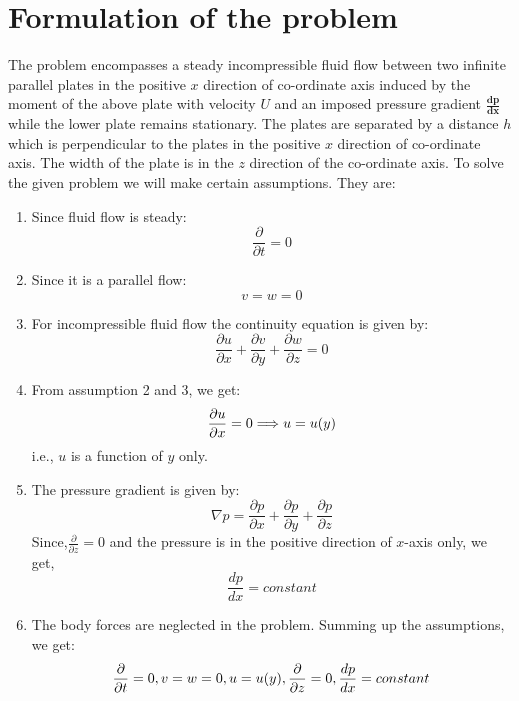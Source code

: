 \documentclass[14pt,one side, a4paper]{extbook}
\begin{document}
	 	\section{Formulation of the problem} The problem encompasses a steady incompressible fluid flow between two infinite parallel plates in the positive $x$ direction of co-ordinate axis induced by the moment of the above plate with velocity $U$ and an imposed pressure gradient $\mathbf{\frac{dp}{dx}}$ while the lower plate remains stationary. The plates are separated by a distance $h$ which is perpendicular to the plates in the positive $x$ direction of co-ordinate axis. The width of the plate is in the $z$ direction of the co-ordinate axis. 
	 	To solve the given problem we will make certain assumptions. They are:
	 	\begin{enumerate}
	 		\item {Since fluid flow is steady:}$$\frac{\partial}{\partial{t}}=0$$
	 		\item{Since it is a parallel flow:}
	 			$$v=w=0$$ 
	 		\item{For incompressible fluid flow the continuity equation is given by:}$$\frac{\partial{u}}{\partial{x}}+\frac{\partial{v}}{\partial{y}}+\frac{\partial{w}}{\partial{z}}=0$$
	 		\item From assumption 2 and 3, we get:
	 			$$\frac{\partial{u}}{\partial{x}}=0\space\Longrightarrow {u=u(y)}$$
	 			i.e., $u$ is a function of $y$ only.
	 		\item{The pressure gradient is given by:}$$\nabla{p}=\frac{\partial{p}}{\partial{x}}+\frac{\partial{p}}{\partial{y}}+\frac{\partial{p}}{\partial{z}}$$
	 		Since,$\frac{\partial}{\partial{z}}=0$ and the pressure is in the positive direction of $x$-axis only, we get,$$\frac{dp}{dx}=constant$$ 
	 		\item{The body forces are neglected in the problem. Summing up the assumptions, we get:}
	 		\begin{equation}
	 			\frac{\partial}{\partial{t}}=0,\space v=w=0,\space u=u(y), \space\frac{\partial}{\partial{z}}=0,\space \frac{dp}{dx}=constant  
	 		\end{equation}
	 	\end{enumerate}
	 	
\end{document}
